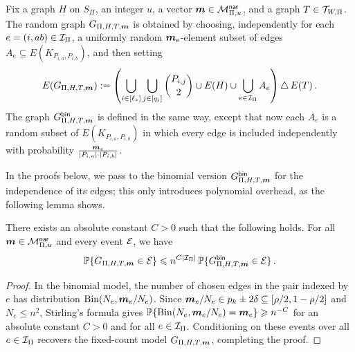 \begin{definition}\label{def:active-random-models-K1k}
Fix a graph $H$ on $S_\Pi$, an integer $u$, a vector $\boldsymbol{m}\in{\mathcal M}^{\mathsf{nar}}_{\Pi,u}$, and a graph $T\in{\mathcal T}_{W,\Pi}$. The random graph $G_{\Pi,H,T,\boldsymbol{m}}$ is obtained by choosing, independently for each $e=(i,ab)\in{\mathcal I}_\Pi$, a uniformly random $\boldsymbol{m}_e$-element subset of edges $A_e\subseteq E(K_{P_{i,a},P_{i,b}})$, and then setting
$$E(G_{\Pi,H,T,\boldsymbol{m}}) := \left(\bigcup_{i\in[\ell_\ast]}\bigcup_{j\in[q_i]}\binom{P_{i,j}}{2}\cup E(H) \cup \bigcup_{e\in{\mathcal I}_\Pi}A_e\right)\triangle\,E(T)\,.$$
The graph $G^{{\mathsf{bin}}}_{\Pi,H,T,\boldsymbol{m}}$ is defined in the same way, except that now each $A_e$ is a random subset of $E(K_{P_{i,a},P_{i,b}})$ in which every edge is included independently with probability $\frac{\boldsymbol{m}_e}{|P_{i,a}|\cdot|P_{i,b}|}$.
\end{definition}

In the proofs below, we pass to the binomial version $G^{{\mathsf{bin}}}_{\Pi,H,T,\boldsymbol{m}}$ for the independence of its edges; this only introduces polynomial overhead, as the following lemma shows.

\begin{lemma}\label{lemma:fixed-count-transfer-K1k}
There exists an absolute constant $C>0$ such that the following holds. For all $\boldsymbol{m}\in{\mathcal M}^{\mathsf{nar}}_{\Pi,u}$ and every event ${\mathcal E}$, we have
$${\mathbb P}\{G_{\Pi,H,T,\boldsymbol{m}}\in{\mathcal E}\}\leqslant n^{C|{\mathcal I}_\Pi|}\,{\mathbb P}\{G^{\mathsf{bin}}_{\Pi,H,T,\boldsymbol{m}}\in{\mathcal E}\}\,.$$
\end{lemma}
\begin{proof}
In the binomial model, the number of chosen edges in the pair indexed by $e$ has distribution $\operatorname{Bin}(N_e,\boldsymbol{m}_e/N_e)$. Since $\boldsymbol{m}_e/N_e\in p_k\pm2\delta\subseteq[\rho/2,1-\rho/2]$ and $N_e\leq n^2$, Stirling's formula gives ${\mathbb P}\{\operatorname{Bin}(N_e,\boldsymbol{m}_e/N_e)=\boldsymbol{m}_e\}\geqslant n^{-C}$ for an absolute constant $C>0$ and for all $e\in{\mathcal I}_\Pi$. Conditioning on these events over all $e\in{\mathcal I}_\Pi$ recovers the fixed-count model $G_{\Pi,H,T,\boldsymbol{m}}$, completing the proof.
\end{proof}

